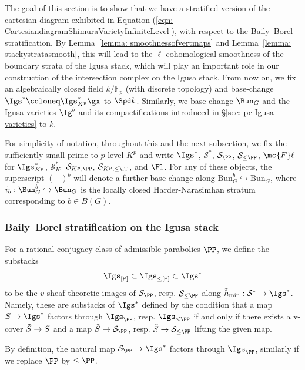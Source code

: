 \documentclass[letterpaper,11pt]{amsart}
\begin{document}
The goal of this section is to show that we have a stratified version of the cartesian diagram exhibited in Equation (\ref{eqn: CartesiandiagramShimuraVarietyInfiniteLevel}), with respect to the Baily--Borel stratification. By Lemma~\ref{lemma: smoothnessofvertmaps} and Lemma~\ref{lemma: stackystratasmooth}, this will lead to the $\ell$-cohomological smoothness of the boundary strata of the Igusa stack, which will play an important role in our construction of the intersection complex on the Igusa stack. From now on,  we fix an algebraically closed field $k/\mathbb{F}_p$ (with discrete topology) and base-change $\Igs^\ast\coloneq \Igs^\ast_{K^p}\gx$ to $\Spd k$. Similarly, we base-change $\Bun_{G}$ and the Igusa varieties $\Ig^{b}$ and its compactifications introduced in \S \ref{sec: pc Igusa varieties} to $k$.

For simplicity of notation, throughout this and the next subsection, we fix the sufficiently small prime-to-$p$ level $K^p$ and write $\Igs^\ast$, $\mathcal{S}^\ast$, $\mathcal{S}_\PP$, $\mathcal{S}_{\leq\PP}$, $\mc{F}\ell$ for $\Igs^\ast_{K^p}$, $\mathcal{S}^\ast_{K^p}$ $\mathcal{S}_{K^p,\PP}$, $\mathcal{S}_{K^p,\leq \PP}$, and $\Fl$. For any of these objects, the superscript $(-)^{b}$ will denote a further base change along $\mathrm{Bun}^b_G\hookrightarrow \mathrm{Bun}_G$, where $i_{b}: \Bun_{G}^{b} \hookrightarrow \Bun_{G}$ is the locally closed Harder-Narasimhan stratum corresponding to $b \in B(G)$.

 \subsubsection{Baily--Borel stratification on the Igusa stack}
\begin{definition}
    For a rational conjugacy class of admissible parabolics $\PP$, we define the substacks
    \[\Igs_{[\mathsf{P}]}\subset \Igs_{\leq [\mathsf{P}]} \subset  \Igs^\ast\]
    to be the $v$-sheaf-theoretic images of $\mathcal{S}_{\PP}$, resp. $\mathcal{S}_{\leq \PP}$ along $\tilde{h}_{\min}: \mathcal{S}^\ast\to \Igs^\ast$. Namely, these are substacks of $\Igs^\ast$ defined by the condition that a map $S\to \Igs^\ast$ factors through $\Igs_{\PP}$, resp. $\Igs_{\leq \PP}$ if and only if there exists a v-cover $\Tilde{S}\to S$ and a map $\Tilde{S}\to \mathcal{S}_{\PP}$, resp. $\Tilde{S}\to \mathcal{S}_{\leq \PP}$ lifting the given map.
\end{definition}

\begin{remark}\label{Rem:FactorThroughP}
By definition, the natural map $\mathcal{S}_{\PP}\to \Igs^\ast$ factors through $\Igs_{\PP}$, similarly if we replace $\PP$ by $\leq \PP$.    
\end{remark}
\end{document}
